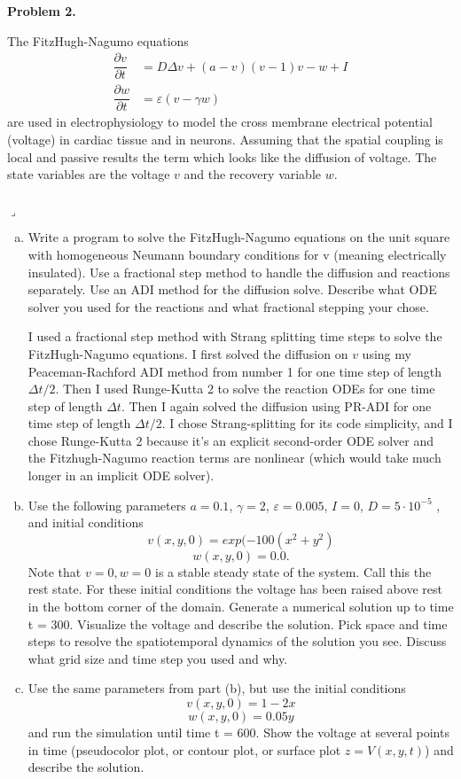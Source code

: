\documentclass[12pt]{article}
\newenvironment{myprob}[1]
    {%
    \noindent{\Huge$\ulcorner$}\textbf{#1.}\begin{em}
    }
    { 
    \end{em} \\ \hphantom{l} \hfill {\Huge$\lrcorner$} }
\begin{document}
\begin{myprob}{Problem 2}
The FitzHugh-Nagumo equations
\begin{align*}
\dfrac{\partial v}{\partial t} &= D \Delta v + (a-v)(v-1)v -w + I \\
\dfrac{\partial w}{\partial t} &= \varepsilon(v-\gamma w)
\end{align*}
are used in electrophysiology to model the cross membrane electrical potential (voltage) in cardiac tissue and in neurons. Assuming that the spatial coupling is local and passive results the term which looks like the diffusion of voltage. The state variables are the voltage $v$ and the recovery variable $w$.
\end{myprob}
\begin{enumerate}[(a)]
\item Write a program to solve the FitzHugh-Nagumo equations on the unit square with homogeneous Neumann boundary conditions for v (meaning electrically insulated). Use a fractional step method to handle the diffusion and reactions separately. Use an ADI method for the diffusion solve. Describe what ODE solver you used for the reactions and what fractional stepping your chose.

I used a fractional step method with Strang splitting time steps to solve the FitzHugh-Nagumo equations.  I first solved the diffusion on $v$ using my Peaceman-Rachford ADI method from number 1 for one time step of length $\Delta t/2$.  Then I used Runge-Kutta 2 to solve the reaction ODEs for one time step of length $\Delta t$.  Then I again solved the diffusion using PR-ADI for one time step of length $\Delta t/2$.  I chose Strang-splitting for its code simplicity, and I chose Runge-Kutta 2 because it's an explicit second-order ODE solver and the Fitzhugh-Nagumo reaction terms are nonlinear (which would take much longer in an implicit ODE solver).

\item Use the following parameters $a = 0.1$, $\gamma = 2$, $\varepsilon = 0.005$, $I = 0$, $D = 5 \cdot 10^{-5}$ , and initial conditions 
$$v(x, y, 0) = exp(-100(x^2 + y^2)$$
$$w(x, y, 0) = 0.0.$$
Note that $v = 0, w = 0$ is a stable steady state of the system. Call this the rest state. For these initial conditions the voltage has been raised above rest in the bottom corner of the domain. Generate a numerical solution up to time t = 300. Visualize the voltage and describe the solution. Pick space and time steps to resolve the spatiotemporal dynamics of the solution you see. Discuss what grid size and time step you used and why.

\item  Use the same parameters from part (b), but use the initial conditions
$$v(x,y,0) = 1-2x$$
$$w(x,y,0) = 0.05y$$
and run the simulation until time t = 600. Show the voltage at several points in time (pseudocolor plot, or contour plot, or surface plot $z = V (x, y, t)$) and describe the solution.
\end{enumerate}
\end{document}
